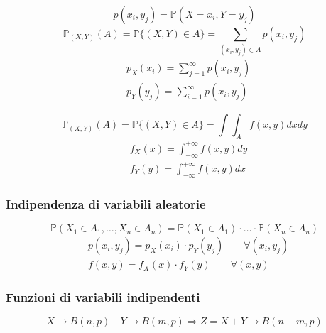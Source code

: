 \begin{proposition}
	\begin{equation}
		p(x_i,y_j) = \mathbb{P}(X=x_i, Y=y_j)
	\end{equation}
	\begin{equation}
		\mathbb{P}_{(X,Y)}(A) = \mathbb{P}\{(X,Y) \in A\} = \sum_{(x_i, y_j) \in A} p(x_i, y_j)
	\end{equation}
	\begin{align}
		& p_X(x_i) = \sum_{j=1}^{\infty}p(x_i, y_j) \\
		& p_Y(y_j) = \sum_{i=1}^{\infty}p(x_i, y_j)
	\end{align}
\end{proposition}

\begin{proposition}
	\begin{equation}
		\mathbb{P}_{(X,Y)}(A) = \mathbb{P}\{(X,Y) \in A\} = \int\int_A f(x,y)dxdy
	\end{equation}
	\begin{align}
		& f_X(x) = \int_{-\infty}^{+\infty} f(x,y) dy \\
		& f_Y(y) = \int_{-\infty}^{+\infty} f(x,y) dx 
	\end{align}
\end{proposition}

\subsubsection{Indipendenza di variabili aleatorie}
\begin{definition}
	\begin{equation}
		\mathbb{P}(X_1 \in A_1, \ldots, X_n \in A_n) = \mathbb{P}(X_1 \in A_1) \cdot \ldots \cdot \mathbb{P}(X_n \in A_n)
	\end{equation}
	\begin{align}
		&p(x_i, y_j) = p_X(x_i) \cdot p_Y(y_j) \quad\quad \forall(x_i, y_j) \\
		& f(x,y) = f_X(x) \cdot f_Y(y) \quad\quad \forall (x,y)
	\end{align}
\end{definition}
\subsubsection{Funzioni di variabili indipendenti}
\begin{proposition}
	\begin{equation}
		X \to B(n,p) \quad Y \to B(m,p) \Longrightarrow Z=X+Y \to B(n+m, p)
	\end{equation}
\end{proposition}

